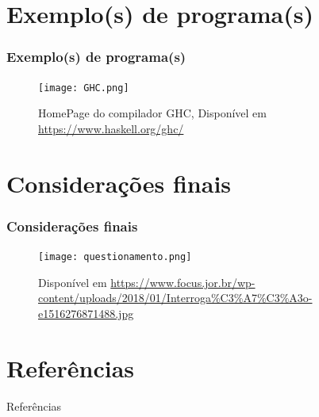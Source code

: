 \documentclass[aspectratio=169]{beamer}
\begin{document}

    \section{Exemplo(s) de programa(s)}

    \begin{frame}
      \frametitle{Exemplo(s) de programa(s)}

      \begin{figure}
        \texttt{[image: GHC.png]}
        \caption{\centering HomePage do compilador GHC, Disponível em \url{https://www.haskell.org/ghc/}}
      \end{figure}

    \end{frame}

    \section{Considerações finais}

    \begin{frame}
      \frametitle{Considerações finais}

      \begin{figure}
        \texttt{[image: questionamento.png]}
        \caption{\centering Disponível em \url{https://www.focus.jor.br/wp-content/uploads/2018/01/Interroga\%C3\%A7\%C3\%A3o-e1516276871488.jpg}}
      \end{figure}


    \end{frame}
    \section{Referências}


    \begin{frame}[allowframebreaks]{Referências}
      
    \end{frame}

\end{document}
